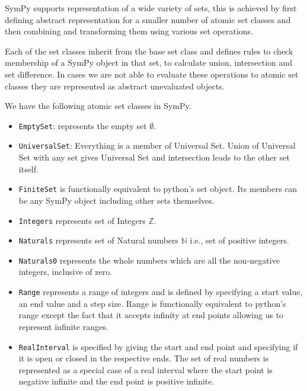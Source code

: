 
SymPy supports representation of a wide variety of sets, this is achieved by
first defining abstract representation for a smaller number of atomic set
classes and then combining and transforming them using various set operations.

Each of the set classes inherit from the base set class and defines rules to
check membership of a SymPy object in that set, to calculate union,
intersection and set difference. In cases we are not able to evaluate these
operations to atomic set classes they are represented as abstract unevaluated
objects.


We have the following atomic set classes in SymPy.

\begin{itemize}

    \item \verb|EmptySet|: represents the empty set $\emptyset$.

    \item \verb|UniversalSet|: Everything is a member of Universal Set.
        Union of Universal Set with any set gives Universal Set and
        intersection leads to the other set itself.

    \item \verb|FiniteSet| is functionally equivalent to python's set
        object. Its members can be any SymPy object including other sets
        themselves.

    \item \verb|Integers| represents set of Integers $\mathbb{Z}$.

    \item \verb|Naturals| represents set of Natural numbers $\mathbb{N}$ i.e.,
        set of positive integers.

    \item \verb|Naturals0| represents the whole numbers which are all the
        non-negative integers, inclusive of zero.

    \item \verb|Range| represents a range of integers and is defined by
        specifying a start value, an end value and a step size. Range is
        functionally equivalent to python's range except the fact that it
        accepts infinity at end points allowing us to represent infinite
        ranges.


    \item \verb|RealInterval| is specified by giving the start and end point
        and specifying if it is open or closed in the respective ends. The set
        of real numbers is represented as a special case of a real interval
        where the start point is negative infinite and the end point is
        positive infinite.


\end{itemize}


